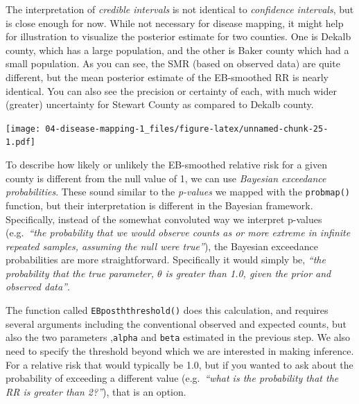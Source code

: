 \documentclass[
]{book}
\newenvironment{Shaded}{\begin{snugshade}}{\end{snugshade}}
\newcommand{\AttributeTok}[1]{\textcolor[rgb]{0.13,0.29,0.53}{#1}}
\newcommand{\DecValTok}[1]{\textcolor[rgb]{0.00,0.00,0.81}{#1}}
\newcommand{\FunctionTok}[1]{\textcolor[rgb]{0.13,0.29,0.53}{\textbf{#1}}}
\newcommand{\NormalTok}[1]{#1}
\newcommand{\OtherTok}[1]{\textcolor[rgb]{0.56,0.35,0.01}{#1}}
\newcommand{\SpecialCharTok}[1]{\textcolor[rgb]{0.81,0.36,0.00}{\textbf{#1}}}
\begin{document}
The interpretation of \emph{credible intervals} is not identical to \emph{confidence intervals}, but is close enough for now. While not necessary for disease mapping, it might help for illustration to visualize the posterior estimate for two counties. One is Dekalb county, which has a large population, and the other is Baker county which had a small population. As you can see, the SMR (based on observed data) are quite different, but the mean posterior estimate of the EB-smoothed RR is nearly identical. You can also see the precision or certainty of each, with much wider (greater) uncertainty for Stewart County as compared to Dekalb county.

\texttt{[image: 04-disease-mapping-1\_files/figure-latex/unnamed-chunk-25-1.pdf]}

To describe how likely or unlikely the EB-smoothed relative risk for a given county is different from the null value of 1, we can use \emph{Bayesian exceedance probabilities}. These sound similar to the \emph{p-values} we mapped with the \texttt{probmap()} function, but their interpretation is different in the Bayesian framework. Specifically, instead of the somewhat convoluted way we interpret p-values (e.g.~\emph{``the probability that we would observe counts as or more extreme in infinite repeated samples, assuming the null were true''}), the Bayesian exceedance probabilities are more straightforward. Specifically it would simply be, \emph{``the probability that the true parameter, \(\theta\) is greater than 1.0, given the prior and observed data''}.

The function called \texttt{EBposththreshold()} does this calculation, and requires several arguments including the conventional observed and expected counts, but also the two parameters ,\texttt{alpha} and \texttt{beta} estimated in the previous step. We also need to specify the threshold beyond which we are interested in making inference. For a relative risk that would typically be 1.0, but if you wanted to ask about the probability of exceeding a different value (e.g.~\emph{``what is the probability that the RR is greater than 2?''}), that is an option.

\begin{Shaded}
\end{Shaded}
\end{document}
